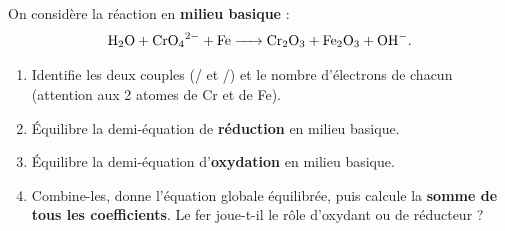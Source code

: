 \documentclass[11pt,a4paper]{article}
\newcounter{exo}
\begin{document}
\begin{exo}
On considère la réaction en \textbf{milieu basique} :
\[
\ce{H2O + CrO4^{2-} + Fe -> Cr2O3 + Fe2O3 + OH^-}.
\]
\begin{enumerate}[label=\textbf{\alph*)},leftmargin=2.2em,topsep=2pt,itemsep=2pt]
  \item Identifie les deux couples (/ et /) et le nombre
        d'électrons de chacun (attention aux 2 atomes de Cr et de Fe).
  \item Équilibre la demi-équation de \textbf{réduction} en milieu basique.
  \item Équilibre la demi-équation d'\textbf{oxydation} en milieu basique.
  \item Combine-les, donne l'équation globale équilibrée, puis calcule la \textbf{somme de tous les
        coefficients}. Le fer joue-t-il le rôle d'oxydant ou de réducteur ?
\end{enumerate}
\end{exo}
\end{document}
